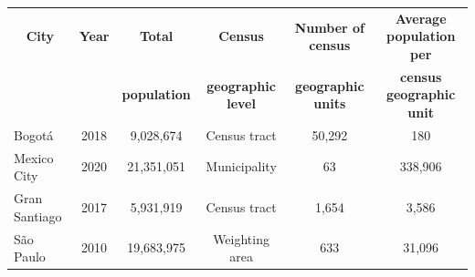 \begin{tabular}{lccccc}
    \toprule
    \toprule
    \multicolumn{1}{c}{\textbf{City}} & \multicolumn{1}{c}{\textbf{Year}} & \multicolumn{1}{c}{\textbf{Total}} & \multicolumn{1}{c}{\textbf{Census}} & \multicolumn{1}{c}{\textbf{Number of census}} & \multicolumn{1}{c}{\textbf{Average population per}} \\
    & & \multicolumn{1}{c}{\textbf{population}} & \multicolumn{1}{c}{\textbf{geographic level}} & \multicolumn{1}{c}{\textbf{geographic units}} & \multicolumn{1}{c}{\textbf{census geographic unit}} \\
    \midrule
    Bogot\'a & 2018 & 9,028,674 & Census tract & 50,292 & 180 \\
    Mexico City & 2020 & 21,351,051 & Municipality & 63 & 338,906 \\
    Gran Santiago & 2017 & 5,931,919 & Census tract & 1,654 & 3,586 \\
    S\~ao Paulo & 2010 & 19,683,975 & Weighting area & 633 & 31,096 \\
    \bottomrule
    \bottomrule
\end{tabular}
